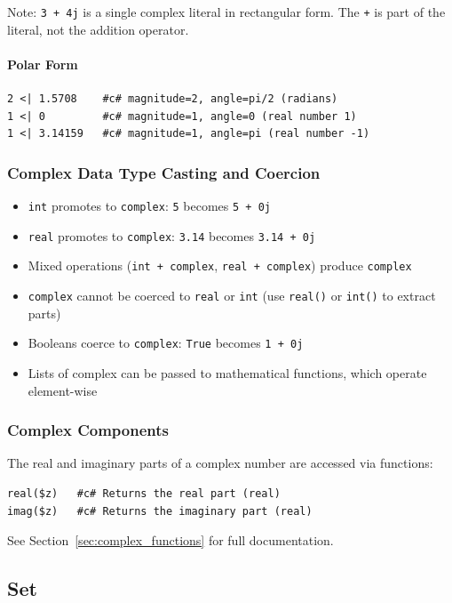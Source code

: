 Note: \texttt{3 + 4j} is a single complex literal in rectangular form. The \texttt{+} is part of the literal, not the addition operator.

\paragraph{Polar Form}
\begin{verbatim}
2 <| 1.5708    #c# magnitude=2, angle=pi/2 (radians)
1 <| 0         #c# magnitude=1, angle=0 (real number 1)
1 <| 3.14159   #c# magnitude=1, angle=pi (real number -1)
\end{verbatim}

\subsubsection{Complex Data Type Casting and Coercion}
\begin{itemize}
\item \texttt{int} promotes to \texttt{complex}: \texttt{5} becomes \texttt{5 + 0j}
\item \texttt{real} promotes to \texttt{complex}: \texttt{3.14} becomes \texttt{3.14 + 0j}
\item Mixed operations (\texttt{int + complex}, \texttt{real + complex}) produce \texttt{complex}
\item \texttt{complex} cannot be coerced to \texttt{real} or \texttt{int} (use \texttt{real()} or \texttt{int()} to extract parts)
\item Booleans coerce to \texttt{complex}: \texttt{True} becomes \texttt{1 + 0j}
\item Lists of complex can be passed to mathematical functions, which operate element-wise
\end{itemize}

\subsubsection{Complex Components}
The real and imaginary parts of a complex number are accessed via functions:
\begin{verbatim}
real($z)   #c# Returns the real part (real)
imag($z)   #c# Returns the imaginary part (real)
\end{verbatim}
See Section~\ref{sec:complex_functions} for full documentation.
\subsection{Set}
